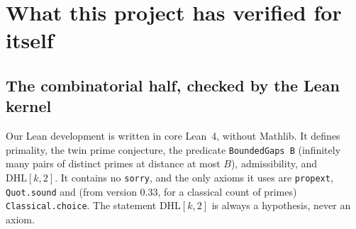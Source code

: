 \documentclass[11pt]{amsart}
\theoremstyle{definition}
\theoremstyle{remark}
\newcommand{\DHL}{\mathrm{DHL}}
\begin{document}
\section{What this project has verified for itself}

\subsection{The combinatorial half, checked by the Lean kernel}

Our Lean development is written in core Lean~4, without Mathlib. It defines
primality, the twin prime conjecture, the predicate \texttt{BoundedGaps B}
(infinitely many pairs of distinct primes at distance at most $B$),
admissibility, and $\DHL[k,2]$. It contains no \texttt{sorry}, and the only
axioms it uses are \texttt{propext}, \texttt{Quot.sound} and (from version
0.33, for a classical count of primes) \texttt{Classical.choice}. The statement
$\DHL[k,2]$ is always a hypothesis, never an axiom.
\end{document}
